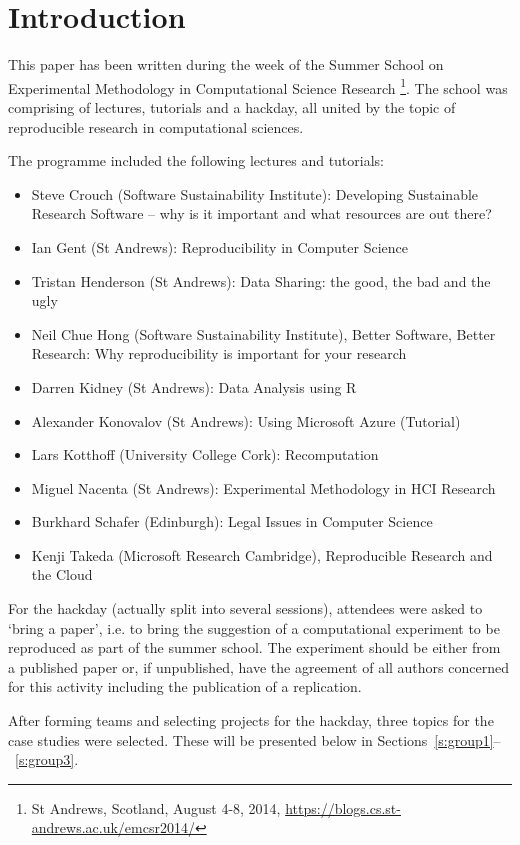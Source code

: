 \section{Introduction}
\label{s:intro}

This paper has been written during the week of the Summer School
on Experimental Methodology in Computational Science Research
\footnote{St Andrews, Scotland, August 4-8, 2014,
\url{https://blogs.cs.st-andrews.ac.uk/emcsr2014/}}. The 
school was comprising of lectures, tutorials and a hackday,
all united by the topic of reproducible research in computational
sciences. 

The programme included the following lectures and tutorials:
\begin{itemize}
   \item Steve Crouch (Software Sustainability Institute): Developing Sustainable Research Software -- why is it important and what resources are out there?
   \item Ian Gent (St Andrews): Reproducibility in Computer Science
   \item Tristan Henderson (St Andrews): Data Sharing: the good, the bad and the ugly
    \item Neil Chue Hong (Software Sustainability Institute), Better Software, Better Research: Why reproducibility is important for your research
    \item Darren Kidney (St Andrews): Data Analysis using R
    \item Alexander Konovalov (St Andrews): Using Microsoft Azure (Tutorial)
    \item Lars Kotthoff (University College Cork): Recomputation
    \item Miguel Nacenta (St Andrews): Experimental Methodology in HCI Research
    \item Burkhard Schafer (Edinburgh): Legal Issues in Computer Science
    \item Kenji Takeda (Microsoft Research Cambridge), Reproducible Research and the Cloud
\end{itemize}

For the hackday (actually split into several sessions), attendees 
were asked to `bring a paper', i.e. to bring the suggestion of a 
computational experiment to be reproduced as part of the summer school. 
The experiment should be either from a published paper or, if unpublished, 
have the agreement of all authors concerned for this activity including 
the publication of a replication. 

After forming teams and selecting projects for the hackday, three
topics for the case studies were selected. These will be presented below
in Sections~\ref{s:group1}--~\ref{s:group3}.



